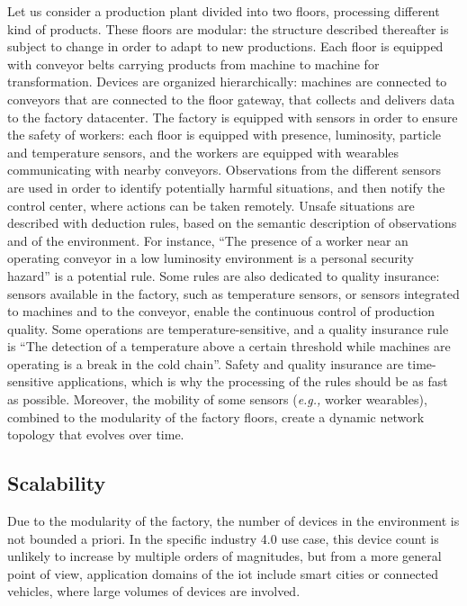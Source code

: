 \documentclass{iosart2c}
\begin{document}
Let us consider a production plant divided into two floors, processing different kind of products. 
These floors are modular: the structure described thereafter is subject to change in order to adapt to new productions.
Each floor is equipped with conveyor belts carrying products from machine to machine for transformation. 
Devices are organized hierarchically: machines are connected to conveyors that are connected to the floor gateway, that collects and delivers data to the factory datacenter. 
The factory is equipped with sensors in order to ensure the safety of workers: each floor is equipped with presence, luminosity, particle and temperature sensors, and the workers are equipped with wearables communicating with nearby conveyors.
Observations from the different sensors are used in order to identify potentially harmful situations, and then notify the control center, where actions can be taken remotely.
Unsafe situations are described with deduction rules, based on the semantic description of observations and of the environment.
For instance, 
``The presence of a worker near an operating conveyor in a low luminosity environment is a personal security hazard'' is a potential rule.
Some rules are also dedicated to quality insurance: sensors available in the factory, such as temperature sensors, or sensors integrated to machines and to the conveyor, enable the continuous control of production quality.
Some operations are temperature-sensitive, and a quality insurance rule is ``The detection of a temperature above a certain threshold while machines are operating is a break in the cold chain''.
Safety and quality insurance are time-sensitive applications, which is why the processing of the rules should be as fast as possible.
Moreover, the mobility of some sensors (\textit{e.g.,} worker wearables), combined to the modularity of the factory floors, create a dynamic network topology that evolves over time.

\subsection{Scalability}

Due to the modularity of the factory, the number of devices in the environment is not bounded a priori. 
In the specific industry 4.0 use case, this device count is unlikely to increase by multiple orders of magnitudes, but from a more general point of view, application domains of the \gls{iot} include smart cities or connected vehicles, where large volumes of devices are involved.
\end{document}
